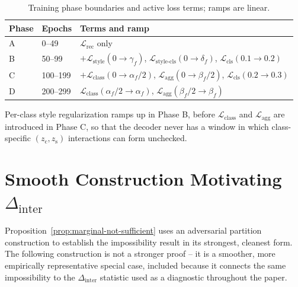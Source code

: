 \documentclass[10pt,letterpaper]{article}
\newcommand{\zc}{z_{\mathrm{c}}}
\newcommand{\zs}{z_{\mathrm{s}}}
\begin{document}
\begin{table}[h]
\centering
\small
\caption{Training phase boundaries and active loss terms; ramps are linear.}
\label{tab:phases}
\begin{tabular}{lll}
\toprule
Phase & Epochs & Terms and ramp \\
\midrule
A & 0--49   & $\mathcal{L}_{\mathrm{rec}}$ only \\
B & 50--99  & $+\mathcal{L}_{\mathrm{style}}(0{\to}\gamma_f)$,
              $\mathcal{L}_{\mathrm{style\text{-}cls}}(0{\to}\delta_f)$,
              $\mathcal{L}_{\mathrm{cls}}(0.1{\to}0.2)$ \\
C & 100--199 & $+\mathcal{L}_{\mathrm{class}}(0{\to}\alpha_f/2)$,
               $\mathcal{L}_{\mathrm{agg}}(0{\to}\beta_f/2)$,
               $\mathcal{L}_{\mathrm{cls}}(0.2{\to}0.3)$ \\
D & 200--299 & $\mathcal{L}_{\mathrm{class}}(\alpha_f/2{\to}\alpha_f)$,
               $\mathcal{L}_{\mathrm{agg}}(\beta_f/2{\to}\beta_f)$ \\
\bottomrule
\end{tabular}
\end{table}

Per-class style regularization ramps up in Phase B, before
$\mathcal{L}_{\mathrm{class}}$ and $\mathcal{L}_{\mathrm{agg}}$ are
introduced in Phase C, so that the decoder never has a window in which
class-specific $(\zc,\zs)$ interactions can form unchecked.

\section{Smooth Construction Motivating $\Delta_{\mathrm{inter}}$}
\label{app:proof}

Proposition~\ref{prop:marginal-not-sufficient} uses an adversarial
partition construction to establish the impossibility result in its
strongest, cleanest form. The following construction is not a stronger
proof -- it is a smoother, more empirically representative special case,
included because it connects the same impossibility to the
$\Delta_{\mathrm{inter}}$ statistic used as a diagnostic throughout the
paper.
\end{document}
